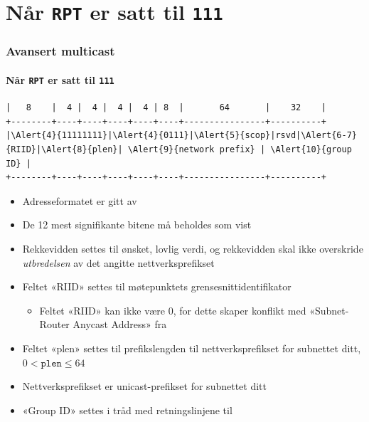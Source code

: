 \section{Når \texttt{RPT} er satt til \texttt{111}}
\begin{frame}[fragile]%
  \frametitle{Avansert multicast}
  \framesubtitle{Når \texttt{RPT} er satt til \texttt{111}}
  \pause
\begin{Verbatim}[commandchars=\\\{\},fontsize=\tiny]
|   8    |  4 |  4 |  4 |  4 | 8  |       64       |    32    |
+--------+----+----+----+----+----+----------------+----------+
|\Alert{4}{11111111}|\Alert{4}{0111}|\Alert{5}{scop}|rsvd|\Alert{6-7}{RIID}|\Alert{8}{plen}| \Alert{9}{network prefix} | \Alert{10}{group ID} |
+--------+----+----+----+----+----+----------------+----------+
\end{Verbatim}
  \pause
  \begin{itemize}[<+->]
  \item Adresseformatet er gitt av 
  \item \alert<4>{De 12 mest signifikante bitene} må beholdes som vist
  \item \alert<5>{Rekkevidden} settes til ønsket, lovlig verdi, og
    rekkevidden skal ikke overskride \textit{utbredelsen\/} av det
    angitte nettverksprefikset
  \item Feltet «RIID» settes til \alert<6>{møtepunktets
      grensesnittidentifikator}
    \begin{itemize}[<+->]
    \item Feltet \alert<7>{«RIID»} kan ikke være \(0\), for dette skaper
      konflikt med «Subnet-Router Anycast Address» fra 
    \end{itemize}
  \item Feltet «plen» settes til \alert<8>{prefikslengden til
      nettverksprefikset for subnettet ditt}, \(0<\mathtt{plen}\le64\)
  \item \alert<9>{Nettverksprefikset} er unicast-prefikset for
    subnettet ditt
  \item \alert<10>{«Group ID»} settes i tråd med retningslinjene til
  \end{itemize}
\end{frame}

